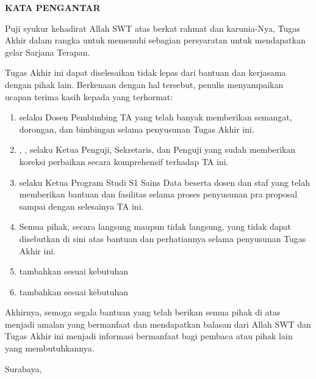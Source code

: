
\clearpage
{}
{}
\begin{center}
    \textbf{\large KATA PENGANTAR}\\[3em]
\end{center}

Puji syukur kehadirat Allah SWT atas berkat rahmat dan karunia-Nya, Tugas Akhir dalam rangka untuk memenuhi sebagian persyaratan untuk mendapatkan gelar Sarjana Terapan.

Tugas Akhir ini dapat diselesaikan tidak lepas dari bantuan dan kerjasama dengan pihak lain. Berkenaan dengan hal tersebut, penulis menyampaikan ucapan terima kasih kepada yang terhormat:

\begin{enumerate}
    \item {\pembimbingsatu} selaku Dosen Pembimbing TA yang telah banyak memberikan semangat, dorongan, dan bimbingan selama penyusunan Tugas Akhir ini.
    \item {\pembimbingsatu}, {\sekretaris}, {\penguji} selaku Ketua Penguji, Sekretaris, dan Penguji yang sudah  memberikan koreksi perbaikan secara komprehensif terhadap TA ini.
    \item {\koorprodi} selaku Ketua Program Studi S1 Sains Data beserta dosen dan staf yang telah memberikan bantuan dan fasilitas selama proses penyusunan pra proposal sampai dengan selesainya TA ini.
    \item Semua pihak, secara langsung maupun tidak langsung, yang tidak dapat disebutkan di sini atas bantuan dan perhatiannya selama penyusunan Tugas Akhir ini.
    \item tambahkan sesuai kebutuhan
    \item tambahkan sesuai kebutuhan
\end{enumerate}

Akhirnya, semoga segala bantuan yang telah berikan semua pihak di atas menjadi amalan yang bermanfaat dan mendapatkan balasan dari Allah SWT dan Tugas Akhir ini menjadi informasi bermanfaat bagi pembaca atau pihak lain yang membutuhkannya.

\begin{flushright}
    Surabaya, \tglpengesahan\\[1.25cm]
    \penulis \\
    \nim
\end{flushright}
